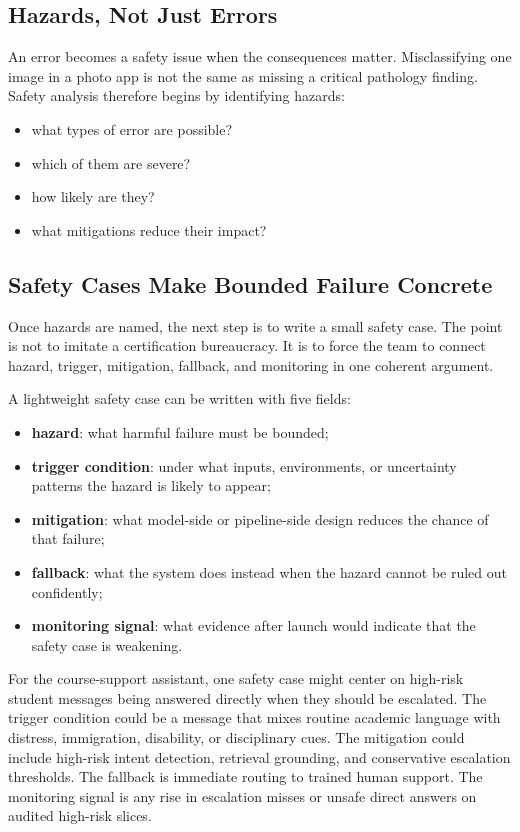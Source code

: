 \subsection{Hazards, Not Just Errors}

An error becomes a safety issue when the consequences matter. Misclassifying one image in a photo app is not the same as missing a critical pathology finding. Safety analysis therefore begins by identifying hazards:
\begin{itemize}[leftmargin=*]
\item what types of error are possible?
\item which of them are severe?
\item how likely are they?
\item what mitigations reduce their impact?
\end{itemize}

\subsection{Safety Cases Make Bounded Failure Concrete}

Once hazards are named, the next step is to write a small safety case. The point is not to imitate a certification bureaucracy. It is to force the team to connect hazard, trigger, mitigation, fallback, and monitoring in one coherent argument.

A lightweight safety case can be written with five fields:
\begin{itemize}[leftmargin=*]
\item \textbf{hazard}: what harmful failure must be bounded;
\item \textbf{trigger condition}: under what inputs, environments, or uncertainty patterns the hazard is likely to appear;
\item \textbf{mitigation}: what model-side or pipeline-side design reduces the chance of that failure;
\item \textbf{fallback}: what the system does instead when the hazard cannot be ruled out confidently;
\item \textbf{monitoring signal}: what evidence after launch would indicate that the safety case is weakening.
\end{itemize}

For the course-support assistant, one safety case might center on high-risk student messages being answered directly when they should be escalated. The trigger condition could be a message that mixes routine academic language with distress, immigration, disability, or disciplinary cues. The mitigation could include high-risk intent detection, retrieval grounding, and conservative escalation thresholds. The fallback is immediate routing to trained human support. The monitoring signal is any rise in escalation misses or unsafe direct answers on audited high-risk slices.


